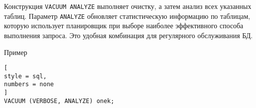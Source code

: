 \documentclass[%
	11pt,
	a4paper,
	utf8,
		]{article}
\begin{document}
Конструкция \texttt{VACUUM ANALYZE} выполняет очистку, а затем анализ всех указанных таблиц. Параметр \texttt{ANALYZE} обновляет статистическую информацию по таблицам, которую использует планировщик при выборе наиболее эффективного способа выполнения запроса. Это удобная комбинация для регулярного обслуживания БД.

Пример
\begin{lstlisting}[
style = sql,
numbers = none
]
VACUUM (VERBOSE, ANALYZE) onek;
\end{lstlisting}



\begin{thebibliography}{99}
	
	
\end{thebibliography}


\lstlistoflistings{}
\end{document}
